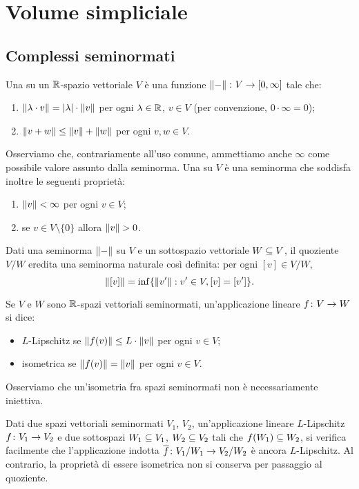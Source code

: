 \section{Volume simpliciale}

\subsection{Complessi seminormati}

\begin{definition}
Una  su un $\mathbb{R}$-spazio vettoriale $V$ è una funzione $\map{\norm{-}}{V}{[0,\infty]}$ tale che:
\begin{enumerate}
\item $\left\lVert \lambda\cdot v\right\rVert=|\lambda|\cdot\left\lVert v\right\rVert$ per ogni $\lambda\in\mathbb{R}$, $v\in V$ (per convenzione, $0\cdot\infty=0$);
\item $\left\lVert v+w\right\rVert\le\left\lVert v\right\rVert+\left\lVert w\right\rVert$ per ogni $v,w\in V$.
\end{enumerate}
\end{definition}
Osserviamo che, contrariamente all'uso comune, ammettiamo anche $\infty$ come possibile valore assunto dalla seminorma. Una  su $V$ è una seminorma che soddisfa inoltre le seguenti proprietà:
\begin{enumerate}
\item $\left\lVert v\right\rVert<\infty$ per ogni $v\in V$;
\item se $v\in V\setminus\{0\}$ allora $\left\lVert v\right\rVert>0$.
\end{enumerate}

Dati una seminorma $\left\lVert -\right\rVert$ su $V$ e un sottospazio vettoriale $W\subseteq V$, il quoziente $V/W$ eredita una seminorma naturale così definita: per ogni $[v]\in V/W$,
\[
\left\lVert [v]\right\rVert=\inf\{\left\lVert v'\right\rVert:v'\in V,[v]=[v']\}.
\]

Se $V$ e $W$ sono $\mathbb{R}$-spazi vettoriali seminormati, un'applicazione lineare $\map{f}{V}{W}$ si dice:
\begin{itemize}
\item $L$-Lipschitz se $\left\lVert f(v)\right\rVert\le L\cdot\left\lVert v\right\rVert$ per ogni $v\in V$;
\item isometrica se $\left\lVert f(v)\right\rVert=\left\lVert v\right\rVert$ per ogni $v\in V$.
\end{itemize}
Osserviamo che un'isometria fra spazi seminormati non è necessariamente iniettiva. 

Dati due spazi vettoriali seminormati $V_1$, $V_2$, un'applicazione lineare $L$-Lipschitz $\map{f}{V_1}{V_2}$ e due sottospazi $W_1\subseteq V_1$, $W_2\subseteq V_2$ tali che $f(W_1)\subseteq W_2$, si verifica facilmente che l'applicazione indotta $\map{\overline{f}}{V_1/W_1}{V_2/W_2}$ è ancora $L$-Lipschitz. Al contrario, la proprietà di essere isometrica non si conserva per passaggio al quoziente.

